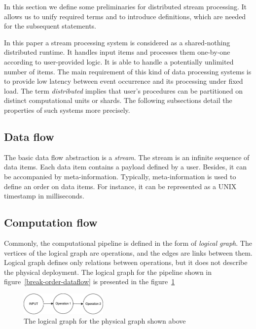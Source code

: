 

\label {fs-stream}

In this section we define some preliminaries for distributed stream processing. It allows us to unify required terms and to introduce definitions, which are needed for the subsequent statements.

In this paper a stream processing system is considered as a shared-nothing distributed runtime. It handles input items and processes them one-by-one according to user-provided logic. It is able to handle a potentially unlimited number of items. The main requirement of this kind of data processing systems is to provide low latency between event occurrence and its processing under fixed load. The term {\em distributed} implies that user's procedures can be partitioned on distinct computational units or shards. The following subsections detail the properties of such systems more precisely.  

\subsection{Data flow}
The basic data flow abstraction is a {\it stream}. The stream is an infinite sequence of data items. Each data item contains a payload defined by a user. Besides, it can be accompanied by meta-information. Typically, meta-information is used to define an order on data items. For instance, it can be represented as a UNIX timestamp in milliseconds.


\subsection{Computation flow}
Commonly, the computational pipeline is defined in the form of {\it logical graph}. The vertices of the logical graph are operations, and the edges are links between them. Logical graph defines only relations between operations, but it does not describe the physical deployment. The logical graph for the pipeline shown in figure~\ref{break-order-dataflow} is presented in the figure~\ref{break-order-dataflow-logical}

\begin{figure}[htbp]
  \centering
  \includegraphics[width=0.38\textwidth]{pics/break_order_pipeline_logical}
  \caption{The logical graph for the physical graph shown above} 
  \label {break-order-dataflow-logical}
\end{figure}

